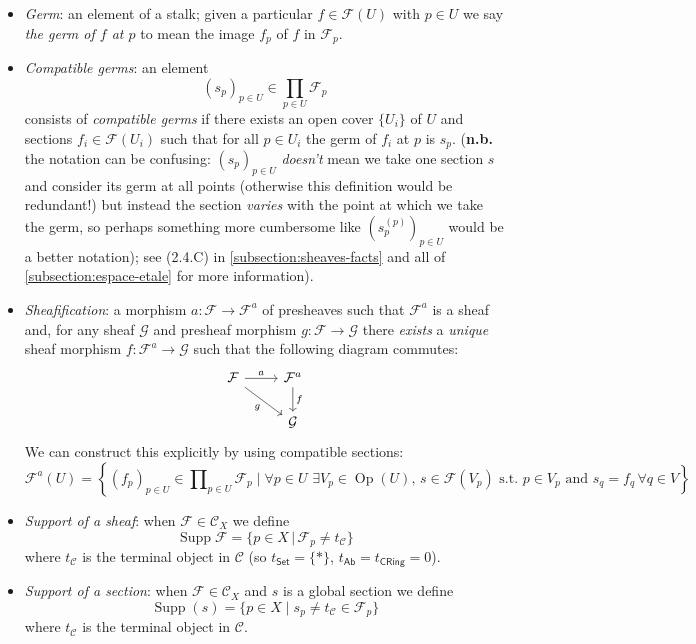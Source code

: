 \documentclass[10pt]{article}
\DeclareMathOperator{\Op}{Op}
\DeclareMathOperator{\Supp}{Supp}
\newcommand{\Set}{\mathsf{Set}}
\newcommand{\Ab}{\mathsf{Ab}}
\newcommand{\CRing}{\mathsf{CRing}}
\newcommand{\ccat}{\mathcal{C}}
\newcommand{\fsheaf}{\mathcal{F}}
\newcommand{\gsheaf}{\mathcal{G}}
\begin{document}
\begin{itemize}
                    \item \textit{Germ}: an element of a stalk; given a particular $f\in\fsheaf(U)$ with $p\in U$ we say \textit{the germ of $f$ at $p$} to mean the image $f_p$ of $f$ in $\fsheaf_p$.
                    \item \textit{Compatible germs}: an element \[(s_p)_{p\in U}\in\prod_{p\in U}\fsheaf_p\] consists of \textit{compatible germs} if there exists an open cover $\{U_i\}$ of $U$ and sections $f_i\in\fsheaf(U_i)$ such that for all $p\in U_i$ the germ of $f_i$ at $p$ is $s_p$.
                     (\textbf{n.b.} the notation can be confusing: $(s_p)_{p\in U}$ \textit{doesn't} mean we take one section $s$ and consider its germ at all points (otherwise this definition would be redundant!) but instead the section \textit{varies} with the point at which we take the germ, so perhaps something more cumbersome like $(s^{(p)}_p)_{p\in U}$ would be a better notation); see (2.4.C) in \cref{subsection:sheaves-facts} and all of \cref{subsection:espace-etale} for more information).
                    \item \textit{Sheafification}: a morphism $a\colon\fsheaf\to\fsheaf^a$ of presheaves such that $\fsheaf^a$ is a sheaf and, for any sheaf $\gsheaf$ and presheaf morphism $g\colon\fsheaf\to\gsheaf$ there \textit{exists} a \textit{unique} sheaf morphism $f\colon\fsheaf^a\to\gsheaf$ such that the following diagram commutes:
                        \[\begin{tikzcd}
                            \fsheaf \ar{r}{a} \ar{dr}[swap]{g} & \fsheaf^a \ar{d}{f}\\
                            & \gsheaf
                        \end{tikzcd}\]
                        We can construct this explicitly by using compatible sections:
                        \[\fsheaf^a(U) = \left\{(f_p)_{p\in U}\in\prod\nolimits_{p\in U}\fsheaf_p \mid \forall p\in U\,\, \exists V_p\in\Op(U),\,s\in\fsheaf(V_p)\text{ s.t. }p\in V_p\text{ and }s_q=f_q\,\forall q\in V\right\}\]
                    \item \textit{Support of a sheaf}: when $\fsheaf\in\ccat_X$ we define \[\Supp\fsheaf = \{p\in X \,\big|\, \fsheaf_p\neq t_\ccat\}\]
                        where $t_\ccat$ is the terminal object in $\ccat$ (so $t_\Set=\{*\}$, $t_\Ab=t_\CRing=0$).
                    \item \textit{Support of a section}: when $\fsheaf\in\ccat_X$ and $s$ is a global section we define \[\Supp(s) = \{p\in X\mid s_p\neq t_\ccat\in\fsheaf_p\}\]
                        where $t_\ccat$ is the terminal object in $\ccat$.
                \end{itemize}
                
\end{document}
